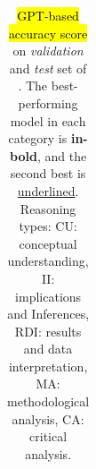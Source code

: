 \begin{table}[hbt!]
\begin{tabular}{@{}lccccccccc@{}}
\bottomrule
\end{tabular}%

\caption{\hl{GPT-based accuracy score} on \emph{validation} and \emph{test} set of \data. The best-performing model in each category is \textbf{in-bold}, and the second best is {\ul{underlined}}. Reasoning types: CU: conceptual understanding, II: implications and Inferences, RDI: results and data interpretation, MA: methodological analysis, CA: critical analysis.}
\label{tab:detail_gpt_based}
\end{table}



